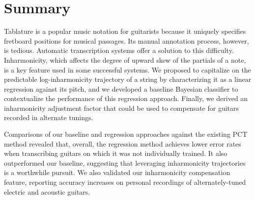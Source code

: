 \documentclass[convention,peer-reviewed]{aesconf}
\begin{document}
\section{Summary} 
Tablature is a popular music notation for guitarists because it uniquely specifies fretboard positions for musical passages. Its manual annotation process, however, is tedious. Automatic transcription systems offer a solution to this difficulty. Inharmonicity, which affects the degree of upward skew of the partials of a note, is a key feature used in some successful systems. We proposed to capitalize on the predictable log-inharmonicity trajectory of a string by characterizing it as a linear regression against its pitch, and we developed a baseline Bayesian classifier to contextualize the performance of this regression approach. Finally, we derived an inharmonicity adjustment factor that could be used to compensate for guitars recorded in alternate tunings.

Comparisons of our baseline and regression approaches against the existing PCT method revealed that, overall, the regression method achieves lower error rates when transcribing guitars on which it was not individually trained. It also outperformed our baseline, suggesting that leveraging inharmonicity trajectories is a worthwhile pursuit. We also validated our inharmonicity compensation feature, reporting accuracy increases on personal recordings of alternately-tuned electric and acoustic guitars.




\end{document}
